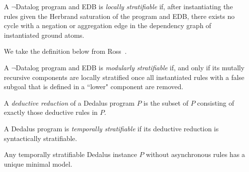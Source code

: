 \begin{definition}
%
A $\lnot$Datalog program and EDB is \emph{locally stratifiable} if, after instantiating the rules
given the Herbrand saturation of the program and EDB, there exists no cycle with a negation 
or aggregation edge in the dependency graph of instantiated ground atoms.
%
\end{definition}


We take the definition below from Ross~\cite{modular, ross-syntactic}.
\begin{definition}
%
A $\lnot$Datalog program and EDB is \emph{modularly stratifiable} if, and only if its mutally recursive 
components are locally stratified once all instantiated rules with a false subgoal that is defined in a 
``lower" component are removed.
\end{definition}


%
%

%
%


\begin{definition}
%
A \emph{deductive reduction} of a Dedalus program $P$ is the subset of $P$
consisting of exactly those deductive rules in $P$.
%
\end{definition}

\begin{definition} 
%
A Dedalus program is \emph{temporally stratifiable} if its deductive
reduction is syntactically stratifiable.
%
\end{definition}

\begin{lemma}
%
Any temporally stratifiable Dedalus instance $P$ without asynchronous rules has
a unique minimal model.
%
\end{lemma} 

